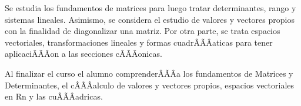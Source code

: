 \begin{sumilla}


\begin{fundamentacion}
Se estudia los fundamentos de matrices para luego tratar determinantes, rango y sistemas lineales. Asimismo, se considera el estudio de valores y vectores propios con la finalidad de diagonalizar una matriz. Por otra parte, se trata espacios vectoriales, transformaciones lineales y formas cuadr\ÃÂÃÂaticas para tener aplicaci\ÃÂÃÂon a las secciones c\ÃÂÃÂonicas.
\end{fundamentacion}

\begin{objetivosdelcurso}
\item Al finalizar el curso el alumno comprender\ÃÂÃÂa los fundamentos de Matrices y Determinantes, el c\ÃÂÃÂalculo de valores y vectores propios, espacios vectoriales en Rn y las cu\ÃÂÃÂadricas.
\end{objetivosdelcurso}

\begin{outcomes}
\end{outcomes}


\end{sumilla}
